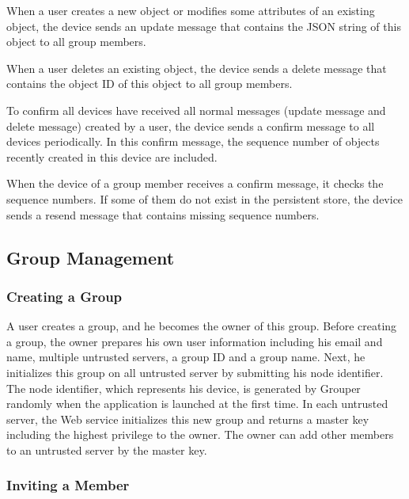 \documentclass[twocolumn,10pt]{article}
\begin{document}
When a user creates a new object or modifies some attributes of an existing object, the device sends an update message that contains the JSON string of this object to all group members.

When a user deletes an existing object, the device sends a delete message that contains the object ID of this object to all group members.

To confirm all devices have received all normal messages (update message and delete message) created by a user, the device sends a confirm message to all devices periodically. 
In this confirm message, the sequence number of objects recently created in this device are included.

When the device of a group member receives a confirm message, it checks the sequence numbers. 
If some of them do not exist in the persistent store, the device sends a resend message that contains missing sequence numbers.

\subsection{Group Management}

\subsubsection{Creating a Group}

A user creates a group, and he becomes the owner of this group.  
Before creating a group, the owner prepares his own user information including his email and name, multiple untrusted servers, a group ID and a group name. 
Next, he initializes this group on all untrusted server by submitting his node identifier. 
The node identifier, which represents his device, is generated by Grouper randomly when the application is launched at the first time. 
In each untrusted server, the Web service initializes this new group and returns a master key including the highest privilege to the owner. 
The owner can add other members to an untrusted server by the master key.

\subsubsection{Inviting a Member}
\end{document}
